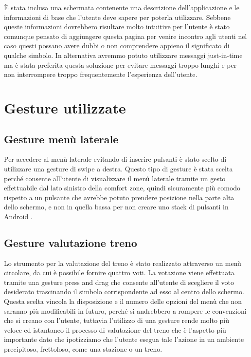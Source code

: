 È stata inclusa una schermata contenente una descrizione dell'applicazione e le informazioni di base che l'utente deve sapere per poterla utilizzare. Sebbene queste informazioni dovrebbero risultare molto intuitive per l'utente è stato comunque pensato di aggiungere questa pagina per venire incontro agli utenti nel caso questi possano avere dubbi o non comprendere appieno il significato di qualche simbolo. In alternativa avremmo potuto utilizzare messaggi just-in-time ma è stata preferita questa soluzione per evitare messaggi troppo lunghi e per non interrompere troppo frequentemente l'esperienza dell'utente.

\section{Gesture utilizzate\label{sec:gesture}}

\subsection{Gesture menù laterale}
Per accedere al menù laterale evitando di inserire pulsanti è stato scelto di utilizzare una gesture di swipe a destra. Questo tipo di gesture è stata scelta perché consente all'utente di visualizzare il menù laterale tramite un gesto effettuabile dal lato sinistro della comfort zone, quindi sicuramente più comodo rispetto a un pulsante che avrebbe potuto prendere posizione nella parte alta dello schermo, e non in quella bassa per non creare uno stack di pulsanti in Android \parencite{gaggi:mobileDesign}.

\subsection{Gesture valutazione treno}
Lo strumento per la valutazione del treno è stato realizzato attraverso un menù circolare, da cui è possibile fornire quattro voti. La votazione viene effettuata tramite una gesture press and drag che consente all'utente di scegliere il voto desiderato trascinando il simbolo corrispondente ad esso al centro dello schermo. 
Questa scelta vincola la disposizione e il numero delle opzioni del menù che non saranno più modificabili in futuro, perché si andrebbero a rompere le convenzioni che si creano con l'utente, tuttavia l'utilizzo di una gesture rende molto più veloce ed istantaneo il processo di valutazione del treno che è l'aspetto più importante dato che ipotizziamo che l'utente esegua tale l'azione in un ambiente precipitoso, frettoloso, come una stazione o un treno.   


